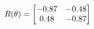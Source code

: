 \documentclass[preview]{standalone}
\begin{document}
\begin{align*}
\special{dvisvgm:raw <g id='unique000'>}R(\theta) = \begin{bmatrix}-0.87 & -0.48\\0.48 & -0.87\end{bmatrix}\special{dvisvgm:raw </g>}
\end{align*}
\end{document}
